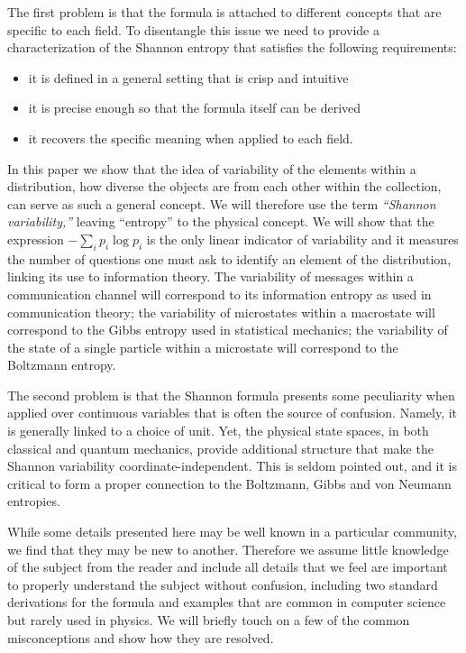 \documentclass[iopart]{revtex4-1}
\begin{document}
The first problem is that the formula is attached to different concepts that are specific to each field. To disentangle this issue we need to provide a characterization of the Shannon entropy that satisfies the following requirements:
\begin{itemize}
	\item it is defined in a general setting that is crisp and intuitive
	\item it is precise enough so that the formula itself can be derived
	\item it recovers the specific meaning when applied to each field.
\end{itemize}
In this paper we show that the idea of variability of the elements within a distribution, how diverse the objects are from each other within the collection, can serve as such a general concept. We will therefore use the term \emph{``Shannon variability,''} leaving ``entropy'' to the physical concept. We will show that the expression $- \sum_i p_i \log p_i$ is the only linear indicator of variability and it measures the number of questions one must ask to identify an element of the distribution, linking its use to information theory. The variability of messages within a communication channel will correspond to its information entropy as used in communication theory; the variability of microstates within a macrostate will correspond to the Gibbs entropy used in statistical mechanics; the variability of the state of a single particle within a microstate will correspond to the Boltzmann entropy.

The second problem is that the Shannon formula presents some peculiarity when applied over continuous variables that is often the source of confusion. Namely, it is generally linked to a choice of unit. Yet, the physical state spaces, in both classical and quantum mechanics, provide additional structure that make the Shannon variability coordinate-independent. This is seldom pointed out, and it is critical to form a proper connection to the Boltzmann, Gibbs and von Neumann entropies.

While some details presented here may be well known in a particular community, we find that they may be new to another. Therefore we assume little knowledge of the subject from the reader and include all details that we feel are important to properly understand the subject without confusion, including two standard derivations for the formula and examples that are common in computer science but rarely used in physics. We will briefly touch on a few of the common misconceptions and show how they are resolved.
\end{document}
